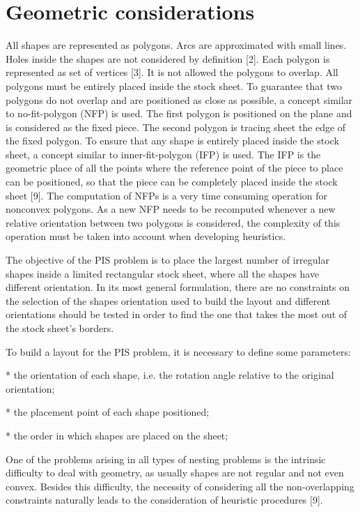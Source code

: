 \documentclass{llncs}
\begin{document}
\section{Geometric considerations}
%
All shapes are represented as polygons. Arcs are approximated with small lines. Holes inside the shapes are not considered by definition [2]. Each polygon is represented as set of vertices [3]. It is not allowed the polygons to overlap. All polygons must be entirely placed inside the stock sheet. To guarantee that two polygons do not overlap and are positioned as close as possible, a concept similar to no-fit-polygon (NFP) is used. The first polygon is positioned on the plane and is considered as the fixed piece. The second polygon is tracing sheet the edge of the fixed polygon. To ensure that any shape is entirely placed inside the stock sheet, a concept similar to inner-fit-polygon (IFP) is used. The IFP is the geometric place of all the points where the reference point of the piece to place can be positioned, so that the piece can be completely placed inside the stock sheet [9]. The computation of NFPs is a very time consuming operation for nonconvex polygons. As a new NFP needs to be recomputed whenever a new relative orientation between two polygons is considered, the complexity of this operation must be taken into account when developing heuristics.

The objective of the PIS problem is to place the largest number of irregular shapes inside a limited rectangular stock sheet, where all the shapes have different orientation. In its most general formulation, there are no constraints on the selection of the shapes orientation used to build the layout and different orientations should be tested in order to find the one that takes the most out of the stock sheet’s borders.

To build a layout for the PIS problem, it is necessary to define some parameters:

* the orientation of each shape, i.e. the rotation angle relative to the original orientation;

* the placement point of each shape positioned;

* the order in which shapes are placed on the sheet;

One of the problems arising in all types of nesting problems is the intrinsic difficulty to deal with geometry, as usually shapes are not regular and not even convex. Besides this difficulty, the necessity of considering all the non-overlapping constraints naturally leads to the consideration of heuristic procedures [9]. 
%
\end{document}
